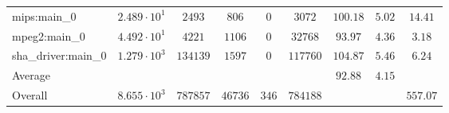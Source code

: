 \begin{tabular}{|l|c|c|c|c|c|c|c|c|}
mips:main\_0            & $ 2.489 \cdot 10^{1} $ & $ 2493   $ & $ 806   $ & $ 0   $ & $ 3072   $ & $ 100.18      $ & $ 5.02    $ & $ 14.41   $ \\
mpeg2:main\_0           & $ 4.492 \cdot 10^{1} $ & $ 4221   $ & $ 1106  $ & $ 0   $ & $ 32768  $ & $ 93.97       $ & $ 4.36    $ & $ 3.18    $ \\
sha\_driver:main\_0     & $ 1.279 \cdot 10^{3} $ & $ 134139 $ & $ 1597  $ & $ 0   $ & $ 117760 $ & $ 104.87      $ & $ 5.46    $ & $ 6.24    $ \\
\hline
Average                 & $                    $ & $        $ & $       $ & $     $ & $        $ & $ 92.88       $ & $ 4.15    $ & $         $ \\
\hline
Overall                 & $ 8.655 \cdot 10^{3} $ & $ 787857 $ & $ 46736 $ & $ 346 $ & $ 784188 $ & $             $ & $         $ & $ 557.07  $ \\
\hline
\end{tabular}
